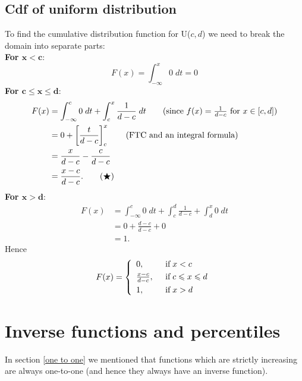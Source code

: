 \subsection{Cdf of uniform distribution} \label{sec15.2}
To find the cumulative distribution function for U($c,d$) we need to break the domain into separate parts: \\
\textbf{For $\boldsymbol{x < c:}$}
\[
F(x) = \int_{-\infty}^x 0 \; dt = 0 \tag{since $f(x) = 0$ for $x < c$} 
\]
\textbf{For $\boldsymbol{c \leq x \leq d:}$}
\begin{align*}
F(x) & = \int_{-\infty}^c 0 \; dt + \int_c^x \frac{1}{d-c} \; dt \tag{since $f(x) = \frac{1}{d-c}$ for $x \in [c,d]$} \\
	& = 0 + \squac{\frac{t}{d-c}}^x_c \tag{FTC and an integral formula} \\
	& = \frac{x}{d-c} - \frac{c}{d-c} \\
	& = \frac{x-c}{d-c}. \tag{$\bigstar$}
\end{align*}
\textbf{For $\boldsymbol{x > d:}$}
\begin{align*}
F(x) & = \int_{-\infty}^c 0 \; dt + \int_c^d \frac{1}{d-c} + \int_d^x 0 \; dt \tag{since $f(x) = 0$ for $c > d$} \\
	& = 0 + \frac{d-c}{d-c} + 0 \tag{substituting $x = d$ into ($\bigstar$)} \\
	& = 1.
\end{align*}
Hence
\[
F(x) = \left\{\begin{array}{ll}
0, & \;\; \text{if} \; x < c \smallskip \\
\frac{x-c}{d-c}, & \;\; \text{if} \; c \leq x \leq d \smallskip \\
1, & \;\; \text{if} \; x > d
\end{array} \right.
\]

\section{Inverse functions and percentiles} \label{cdf strictly increasing 1}
In section \ref{one to one} we mentioned that functions which are strictly increasing are always one-to-one (and hence they always have an inverse function). \\

